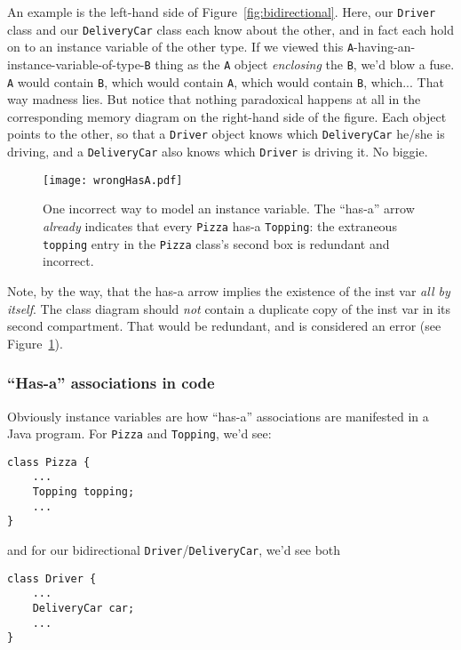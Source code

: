 An example is the left-hand side of Figure~\ref{fig:bidirectional}. Here, our
\texttt{Driver} class and our \texttt{DeliveryCar} class each know about the
other, and in fact each hold on to an instance variable of the other type. If
we viewed this \texttt{A}-having-an-instance-variable-of-type-\texttt{B} thing
as the \texttt{A} object \textit{enclosing} the \texttt{B}, we'd blow a fuse.
\texttt{A} would contain \texttt{B}, which would contain \texttt{A}, which
would contain \texttt{B}, which... That way madness lies. But notice that
nothing paradoxical happens at all in the corresponding memory diagram on the
right-hand side of the figure. Each object points to the other, so that a
\texttt{Driver} object knows which \texttt{DeliveryCar} he/she is driving, and
a \texttt{DeliveryCar} also knows which \texttt{Driver} is driving it. No
biggie.

\begin{figure}[ht]
\centering
\texttt{[image: wrongHasA.pdf]}   %
\caption{One incorrect way to model an instance variable. The ``has-a'' arrow
\textit{already} indicates that every \texttt{Pizza} has-a \texttt{Topping}: the
extraneous \texttt{topping} entry in the \texttt{Pizza} class's second box is
redundant and incorrect.}
\label{fig:wrongHasA}
\end{figure}

Note, by the way, that the has-a arrow implies the existence of the inst var
\textit{all by itself}. The class diagram should \textit{not} contain a
duplicate copy of the inst var in its second compartment. That would be
redundant, and is considered an error (see Figure~\ref{fig:wrongHasA}).

\pagebreak
\subsubsection{``Has-a'' associations in code}

Obviously instance variables are how ``has-a'' associations are manifested in a
Java program. For \texttt{Pizza} and \texttt{Topping}, we'd see:

\begin{Verbatim}[fontsize=\scriptsize,samepage=true,frame=single]
class Pizza {
    ...
    Topping topping;
    ...
}
\end{Verbatim}

and for our bidirectional \texttt{Driver}/\texttt{DeliveryCar}, we'd see both
\begin{Verbatim}[fontsize=\scriptsize,samepage=true,frame=single]
class Driver {
    ...
    DeliveryCar car;
    ...
}
\end{Verbatim}

